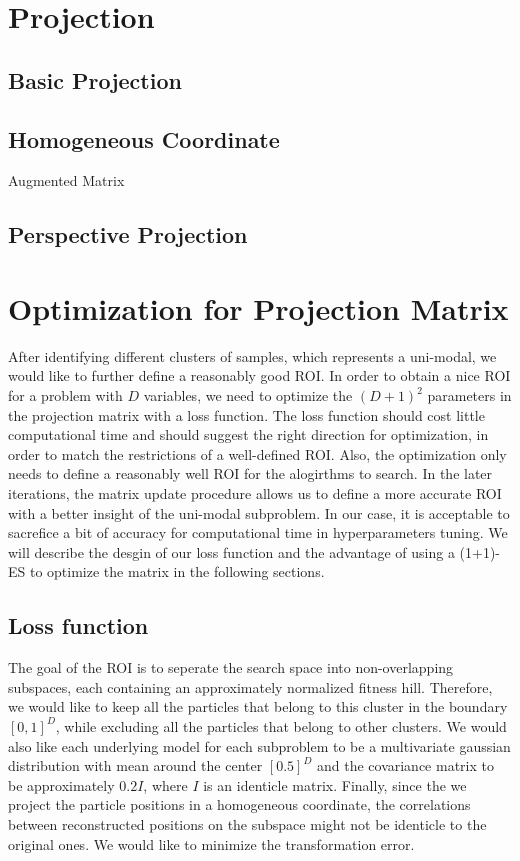 \section{Projection}

\subsection{Basic Projection}


\subsection{Homogeneous Coordinate}
Augmented Matrix



\subsection{Perspective Projection}





\section{Optimization for Projection Matrix}

After identifying different clusters of samples, which represents a uni-modal, 
we would like to further define a reasonably good ROI.
In order to obtain a nice ROI for a problem with $D$ variables, 
we need to optimize the $(D+1)^2$ parameters in the projection matrix with a loss function.
The loss function should cost little computational time and should suggest the right direction for optimization, 
in order to match the restrictions of a well-defined ROI.
Also, the optimization only needs to define a reasonably well ROI for the alogirthms to search.  
In the later iterations, the matrix update procedure allows us to define a more accurate ROI with a better insight of the uni-modal subproblem.
In our case, it is acceptable to sacrefice a bit of accuracy for computational time in hyperparameters tuning.  
We will describe the desgin of our loss function and the advantage of using a (1+1)-ES to optimize the matrix in the following sections.  


\subsection{Loss function}

The goal of the ROI is to seperate the search space into non-overlapping subspaces, 
each containing an approximately normalized fitness hill.
Therefore, we would like to keep all the particles that belong to this cluster in the boundary $[0,1]^D$, 
while excluding all the particles that belong to other clusters.
We would also like each underlying model for each subproblem to be a multivariate gaussian distribution with mean around the center $[0.5]^D$
and the covariance matrix to be approximately $0.2I$, where $I$ is an identicle matrix.
Finally, since the we project the particle positions in a homogeneous coordinate, 
the correlations between reconstructed positions on the subspace might not be identicle to the original ones.
We would like to minimize the transformation error.

